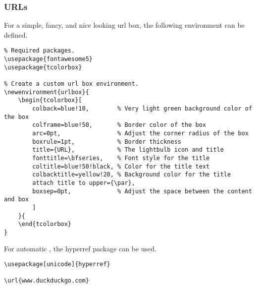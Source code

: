 \subsubsection{URLs}

For a simple, fancy, and nice looking url box, the following environment can be defined.
\begin{lstlisting}
% Required packages.
\usepackage{fontawesome5}
\usepackage{tcolorbox}

% Create a custom url box environment.
\newenvironment{urlbox}{
	\begin{tcolorbox}[
		colback=blue!10,        % Very light green background color of the box
		colframe=blue!50,       % Border color of the box
		arc=0pt,                % Adjust the corner radius of the box
		boxrule=1pt,            % Border thickness
		title={URL},            % The lightbulb icon and title
		fonttitle=\bfseries,    % Font style for the title
		coltitle=blue!50!black, % Color for the title text
		colbacktitle=yellow!20, % Background color for the title
		attach title to upper={\par},
		boxsep=0pt,             % Adjust the space between the content and box
		]
	}{
	\end{tcolorbox}
}
\end{lstlisting}

For automatic , the hyperref package can be used.

\begin{lstlisting}
\usepackage[unicode]{hyperref}

\url{www.duckduckgo.com}
\end{lstlisting}












